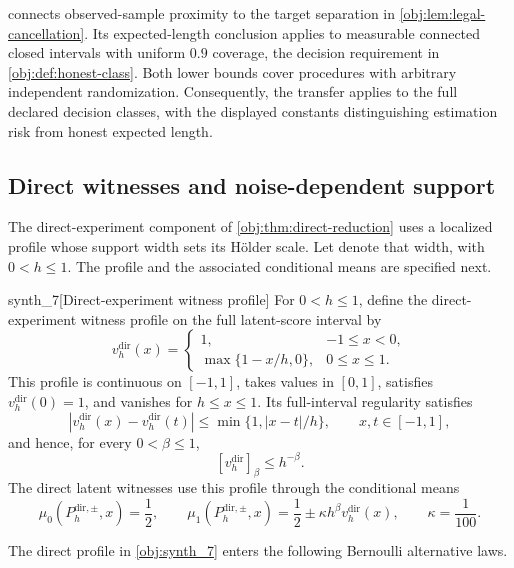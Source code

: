 \documentclass[11pt]{article}
\begin{document}
 connects observed-sample proximity to the target separation in \cref{obj:lem:legal-cancellation}. Its expected-length conclusion applies to measurable connected closed intervals with uniform \(0.9\) coverage, the decision requirement in \cref{obj:def:honest-class}. Both lower bounds cover procedures with arbitrary independent randomization. Consequently, the transfer applies to the full declared decision classes, with the displayed constants distinguishing estimation risk from honest expected length.

\subsection{Direct witnesses and noise-dependent support}

The direct-experiment component of \cref{obj:thm:direct-reduction} uses a localized profile whose support width sets its Hölder scale. Let  denote that width, with \(0<h\le1\). The profile and the associated conditional means are specified next.

\begin{definitionv}{synth_7}[Direct-experiment witness profile]
For \(0<h\le1\), define the direct-experiment witness profile on the full latent-score interval by
\[
v_h^{\mathrm{dir}}(x)=
\begin{cases}
1,&-1\le x<0,\\
\max\{1-x/h,0\},&0\le x\le1.
\end{cases}
\]
This profile is continuous on \([-1,1]\), takes values in \([0,1]\), satisfies \(v_h^{\mathrm{dir}}(0)=1\), and vanishes for \(h\le x\le1\). Its full-interval regularity satisfies
\[
|v_h^{\mathrm{dir}}(x)-v_h^{\mathrm{dir}}(t)|
\le\min\{1,|x-t|/h\},
\qquad x,t\in[-1,1],
\]
and hence, for every \(0<\beta\le1\),
\[
[v_h^{\mathrm{dir}}]_\beta\le h^{-\beta}.
\]
The direct latent witnesses use this profile through the conditional means
\[
\mu_0(P_h^{\mathrm{dir},\pm},x)=\frac12,
\qquad
\mu_1(P_h^{\mathrm{dir},\pm},x)
=\frac12\pm\kappa h^\beta v_h^{\mathrm{dir}}(x),
\qquad \kappa=\frac1{100}.
\]
\end{definitionv}

The direct profile  in \cref{obj:synth_7} enters the following Bernoulli alternative laws.
\end{document}
